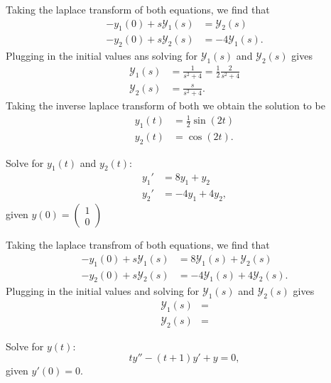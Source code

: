 \begin{soln}
    Taking the laplace transform of both equations, we find that
    \begin{align*}
        -y_1(0)+s\mathcal{Y}_1(s) &= \mathcal{Y}_2(s) \\
        -y_2(0)+s\mathcal{Y}_2(s) &= -4\mathcal{Y}_1(s).
    \end{align*}
    Plugging in the initial values ans solving for $\mathcal{Y}_1(s)$ and
    $\mathcal{Y}_2(s)$ gives
    \begin{align*}
        \mathcal{Y}_1(s) &= \frac{1}{s^2+4} = \frac{1}{2}\frac{2}{s^2+4}\\
        \mathcal{Y}_2(s) &= \frac{s}{s^2+4}.
    \end{align*}
    Taking the inverse laplace transform of both we obtain the solution to be
    \begin{align*}
        y_1(t) &= \frac{1}{2}\sin(2t) \\
        y_2(t) &= \cos(2t).
    \end{align*}
\end{soln}

\begin{example}
    Solve for $y_1(t)$ and $y_2(t)$:
    \begin{align*}
        y_1' &= 8y_1 + y_2 \\
        y_2' &= -4y_1 + 4y_2,
    \end{align*}
    given $y(0) = \begin{pmatrix} 1 \\ 0 \end{pmatrix}$
\end{example}
\begin{soln}
    Taking the laplace transfrom of both equations, we find that 
    \begin{align*}
        -y_1(0)+s\mathcal{Y}_1(s) &= 8\mathcal{Y}_1(s) + \mathcal{Y}_2(s) \\
        -y_2(0)+s\mathcal{Y}_2(s) &= -4\mathcal{Y}_1(s)+4\mathcal{Y}_2(s).
    \end{align*}
    Plugging in the initial values and solving for $\mathcal{Y}_1(s)$ and
    $\mathcal{Y}_2(s)$ gives
    \begin{align*}
        \mathcal{Y}_1(s) &= \\
        \mathcal{Y}_2(s) &=
    \end{align*}
\end{soln}

\begin{example}
    Solve for $y(t)$:
    $$ty''-(t+1)y'+ y = 0,$$
    given $y'(0)=0$.
\end{example}

